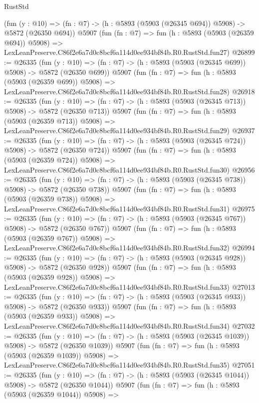 \begin{lexlean}{RustStd}
\begin{coremodule}
    (fun (y : @10) => (fn : @7) -> (h : @5893 (@5903 (@26345 @694)) @5908) -> @5872 (@26350 @694))
    @5907
    (fun (fn : @7) =>
    fun (h : @5893 (@5903 (@26359 @694)) @5908) =>
    LexLeanPreserve.C86f2e6a7d0c8bcf6a114d0ee934bf84b.R0.RustStd.fun27)
@26899 := @26335
    (fun (y : @10) => (fn : @7) -> (h : @5893 (@5903 (@26345 @699)) @5908) -> @5872 (@26350 @699))
    @5907
    (fun (fn : @7) =>
    fun (h : @5893 (@5903 (@26359 @699)) @5908) =>
    LexLeanPreserve.C86f2e6a7d0c8bcf6a114d0ee934bf84b.R0.RustStd.fun28)
@26918 := @26335
    (fun (y : @10) => (fn : @7) -> (h : @5893 (@5903 (@26345 @713)) @5908) -> @5872 (@26350 @713))
    @5907
    (fun (fn : @7) =>
    fun (h : @5893 (@5903 (@26359 @713)) @5908) =>
    LexLeanPreserve.C86f2e6a7d0c8bcf6a114d0ee934bf84b.R0.RustStd.fun29)
@26937 := @26335
    (fun (y : @10) => (fn : @7) -> (h : @5893 (@5903 (@26345 @724)) @5908) -> @5872 (@26350 @724))
    @5907
    (fun (fn : @7) =>
    fun (h : @5893 (@5903 (@26359 @724)) @5908) =>
    LexLeanPreserve.C86f2e6a7d0c8bcf6a114d0ee934bf84b.R0.RustStd.fun30)
@26956 := @26335
    (fun (y : @10) => (fn : @7) -> (h : @5893 (@5903 (@26345 @738)) @5908) -> @5872 (@26350 @738))
    @5907
    (fun (fn : @7) =>
    fun (h : @5893 (@5903 (@26359 @738)) @5908) =>
    LexLeanPreserve.C86f2e6a7d0c8bcf6a114d0ee934bf84b.R0.RustStd.fun31)
@26975 := @26335
    (fun (y : @10) => (fn : @7) -> (h : @5893 (@5903 (@26345 @767)) @5908) -> @5872 (@26350 @767))
    @5907
    (fun (fn : @7) =>
    fun (h : @5893 (@5903 (@26359 @767)) @5908) =>
    LexLeanPreserve.C86f2e6a7d0c8bcf6a114d0ee934bf84b.R0.RustStd.fun32)
@26994 := @26335
    (fun (y : @10) => (fn : @7) -> (h : @5893 (@5903 (@26345 @928)) @5908) -> @5872 (@26350 @928))
    @5907
    (fun (fn : @7) =>
    fun (h : @5893 (@5903 (@26359 @928)) @5908) =>
    LexLeanPreserve.C86f2e6a7d0c8bcf6a114d0ee934bf84b.R0.RustStd.fun33)
@27013 := @26335
    (fun (y : @10) => (fn : @7) -> (h : @5893 (@5903 (@26345 @933)) @5908) -> @5872 (@26350 @933))
    @5907
    (fun (fn : @7) =>
    fun (h : @5893 (@5903 (@26359 @933)) @5908) =>
    LexLeanPreserve.C86f2e6a7d0c8bcf6a114d0ee934bf84b.R0.RustStd.fun34)
@27032 := @26335
    (fun (y : @10) => (fn : @7) -> (h : @5893 (@5903 (@26345 @1039)) @5908) -> @5872 (@26350 @1039))
    @5907
    (fun (fn : @7) =>
    fun (h : @5893 (@5903 (@26359 @1039)) @5908) =>
    LexLeanPreserve.C86f2e6a7d0c8bcf6a114d0ee934bf84b.R0.RustStd.fun35)
@27051 := @26335
    (fun (y : @10) => (fn : @7) -> (h : @5893 (@5903 (@26345 @1044)) @5908) -> @5872 (@26350 @1044))
    @5907
    (fun (fn : @7) =>
    fun (h : @5893 (@5903 (@26359 @1044)) @5908) =>

\end{coremodule}
\end{lexlean}
